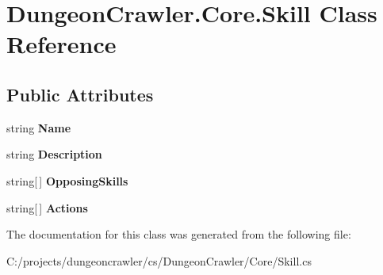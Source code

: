 \hypertarget{class_dungeon_crawler_1_1_core_1_1_skill}{}\section{Dungeon\+Crawler.\+Core.\+Skill Class Reference}
\label{class_dungeon_crawler_1_1_core_1_1_skill}
\subsection*{Public Attributes}
\begin{DoxyCompactItemize}
\item 
\hypertarget{class_dungeon_crawler_1_1_core_1_1_skill_ace8f3c8fa159d45483f754bf53654ee7}{}string {\bfseries Name}\label{class_dungeon_crawler_1_1_core_1_1_skill_ace8f3c8fa159d45483f754bf53654ee7}

\item 
\hypertarget{class_dungeon_crawler_1_1_core_1_1_skill_a52e0bd49a51f220a30d7c59c30712434}{}string {\bfseries Description}\label{class_dungeon_crawler_1_1_core_1_1_skill_a52e0bd49a51f220a30d7c59c30712434}

\item 
\hypertarget{class_dungeon_crawler_1_1_core_1_1_skill_abf3d93fafabca6f964357707de5dac15}{}string\mbox{[}$\,$\mbox{]} {\bfseries Opposing\+Skills}\label{class_dungeon_crawler_1_1_core_1_1_skill_abf3d93fafabca6f964357707de5dac15}

\item 
\hypertarget{class_dungeon_crawler_1_1_core_1_1_skill_a8b622ec466f07a5e50ba891f48188e71}{}string\mbox{[}$\,$\mbox{]} {\bfseries Actions}\label{class_dungeon_crawler_1_1_core_1_1_skill_a8b622ec466f07a5e50ba891f48188e71}

\end{DoxyCompactItemize}


The documentation for this class was generated from the following file\+:\begin{DoxyCompactItemize}
\item 
C\+:/projects/dungeoncrawler/cs/\+Dungeon\+Crawler/\+Core/Skill.\+cs\end{DoxyCompactItemize}
